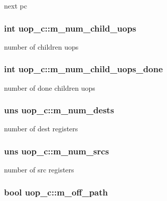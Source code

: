\label{classuop__c_a4aad3ee2a1aa0286421bc198866765b9}
next pc \hypertarget{classuop__c_aa6cfd5b37d0d6f865ed2e8fe795774f4}{
\subsubsection[{m\_\-num\_\-child\_\-uops}]{\setlength{\rightskip}{0pt plus 5cm}int {\bf uop\_\-c::m\_\-num\_\-child\_\-uops}}}
\label{classuop__c_aa6cfd5b37d0d6f865ed2e8fe795774f4}
number of children uops \hypertarget{classuop__c_a788ae8beb7aa64f5192d8b58368fdb72}{
\subsubsection[{m\_\-num\_\-child\_\-uops\_\-done}]{\setlength{\rightskip}{0pt plus 5cm}int {\bf uop\_\-c::m\_\-num\_\-child\_\-uops\_\-done}}}
\label{classuop__c_a788ae8beb7aa64f5192d8b58368fdb72}
number of done children uops \hypertarget{classuop__c_ac68903d9326230501d9800b68e62d11e}{
\subsubsection[{m\_\-num\_\-dests}]{\setlength{\rightskip}{0pt plus 5cm}uns {\bf uop\_\-c::m\_\-num\_\-dests}}}
\label{classuop__c_ac68903d9326230501d9800b68e62d11e}
number of dest registers \hypertarget{classuop__c_a9d462e0b6d7b32a634a44fd979e2987e}{
\subsubsection[{m\_\-num\_\-srcs}]{\setlength{\rightskip}{0pt plus 5cm}uns {\bf uop\_\-c::m\_\-num\_\-srcs}}}
\label{classuop__c_a9d462e0b6d7b32a634a44fd979e2987e}
number of src registers \hypertarget{classuop__c_ad596fa360563f1642c09047c59481abe}{
\subsubsection[{m\_\-off\_\-path}]{\setlength{\rightskip}{0pt plus 5cm}bool {\bf uop\_\-c::m\_\-off\_\-path}}}
